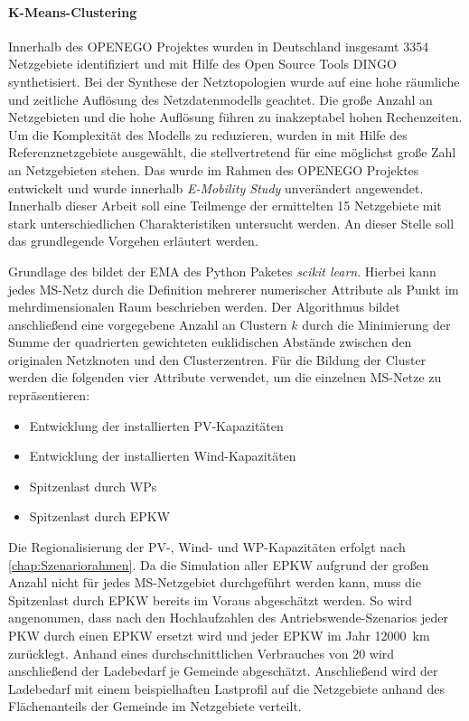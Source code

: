 \paragraph{K-Means-Clustering}

Innerhalb des \gls{OPENEGO} Projektes \cite{Mueller2019} wurden in Deutschland insgesamt {\color{red} \num{3354}} Netzgebiete identifiziert und mit Hilfe des Open Source Tools \gls{DINGO} synthetisiert.
Bei der Synthese der Netztopologien wurde auf eine hohe räumliche und zeitliche Auflösung des Netzdatenmodells geachtet.
Die große Anzahl an Netzgebieten und die hohe Auflösung führen zu inakzeptabel hohen Rechenzeiten.
Um die Komplexität des Modells zu reduzieren, wurden in  mit Hilfe des \kmeans Referenznetzgebiete ausgewählt, die stellvertretend für eine möglichst große Zahl an Netzgebieten stehen.
Das \kmean wurde im Rahmen des \gls{OPENEGO} Projektes \cite{Mueller2019} entwickelt und wurde innerhalb \textit{E-Mobility Study} \cite{Schachler} unverändert angewendet.
Innerhalb dieser Arbeit soll eine Teilmenge der ermittelten \num{15} Netzgebiete mit stark unterschiedlichen Charakteristiken untersucht werden.
An dieser Stelle soll das grundlegende Vorgehen erläutert werden. \medskip

Grundlage des \kmeans bildet der \gls{EMA} des Python Paketes \textit{scikit learn}. \cite{scikit-learn2011}
Hierbei kann jedes \gls{MS}-Netz durch die Definition mehrerer numerischer Attribute als Punkt im mehrdimensionalen Raum beschrieben werden.
Der Algorithmus bildet anschließend eine vorgegebene Anzahl an Clustern $k$ durch die Minimierung der Summe der quadrierten gewichteten euklidischen Abstände zwischen den originalen Netzknoten und den Clusterzentren.
Für die Bildung der Cluster werden die folgenden vier Attribute verwendet, um die einzelnen \gls{MS}-Netze zu repräsentieren:

\begin{itemize}
	\item Entwicklung der installierten \gls{PV}-Kapazitäten
	\item Entwicklung der installierten Wind-Kapazitäten
	\item Spitzenlast durch \glspl{WP}
	\item Spitzenlast durch \gls{EPKW}
\end{itemize}

Die Regionalisierung der \gls{PV}-, Wind- und \gls{WP}-Kapazitäten erfolgt nach \autoref{chap:Szenariorahmen}.
Da die Simulation aller \gls{EPKW} aufgrund der großen Anzahl nicht für jedes \gls{MS}-Netzgebiet durchgeführt werden kann, muss die Spitzenlast durch \gls{EPKW} bereits im Voraus abgeschätzt werden.
So wird angenommen, dass nach den Hochlaufzahlen des Antriebswende-Szenarios jeder \gls{PKW} durch einen \gls{EPKW} ersetzt wird und jeder \gls{EPKW} im Jahr \SI{12000}{\km} zurücklegt.
Anhand eines durchschnittlichen Verbrauches von \SI{20}{\kwhkm} wird anschließend der Ladebedarf je Gemeinde abgeschätzt.
Anschließend wird der Ladebedarf mit einem beispielhaften Lastprofil auf die Netzgebiete anhand des Flächenanteils der Gemeinde im Netzgebiete verteilt.


